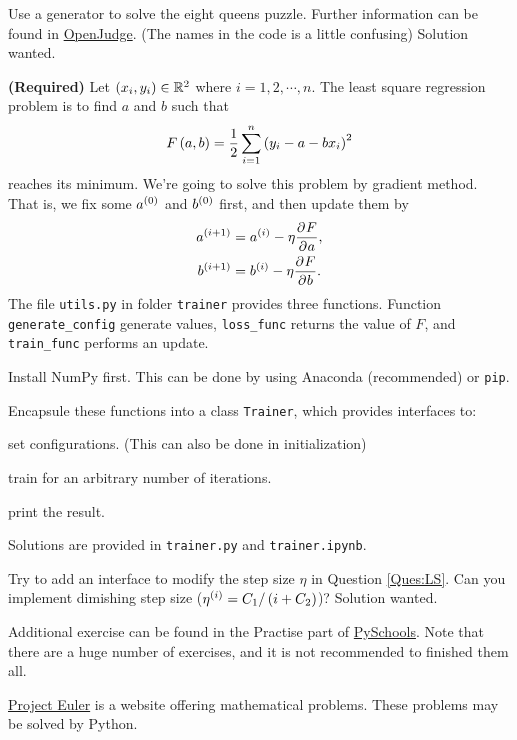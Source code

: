 \documentclass[english]{pkupaper}
\begin{document}
\begin{thmquestion}
Use a generator to solve the eight queens puzzle. Further information can be found in \href{http://cssyb.openjudge.cn/2017finalpython/B/}{OpenJudge}. (The names in the code is a little confusing) Solution wanted.
\end{thmquestion}

\begin{thmquestion} \label{Ques:LS}
\textbf{(Required)} Let $ \left(  x_i, y_i  \right) \in \mathbb{R}^2 $ where $ i = 1, 2, \cdots, n $. The least square regression problem is to find $a$ and $b$ such that
\begin{equation}
F \left(  a, b  \right) = \frac{1}{2} \sum_{ {i} = {1} }^{n}{\left(  y_i - a - b x_i  \right)^2}
\end{equation}
reaches its minimum. We're going to solve this problem by gradient method. That is, we fix some $a^{\left( 0 \right)}$ and $b^{\left( 0 \right)}$ first, and then update them by
\begin{gather}
a^{\left(  i + 1  \right)} = a^{\left( i \right)} - \eta \frac{ \mathop{\partial^{} \!} F }{ \mathop{\partial^{} \!} a }, \\
b^{\left(  i + 1  \right)} = b^{\left( i \right)} - \eta \frac{ \mathop{\partial^{} \!} F }{ \mathop{\partial^{} \!} b }.
\end{gather}
The file \verb"utils.py" in folder \verb"trainer" provides three functions. Function \verb"generate_config" generate values, \verb"loss_func" returns the value of $F$, and \verb"train_func" performs an update.
\begin{partlist}
\item Install NumPy first. This can be done by using Anaconda (recommended) or \verb"pip".
\item Encapsule these functions into a class \verb"Trainer", which provides interfaces to:
\begin{partpartlist}
\item set configurations. (This can also be done in initialization)
\item train for an arbitrary number of iterations.
\item print the result.
\end{partpartlist}
\end{partlist}
Solutions are provided in \verb"trainer.py" and \verb"trainer.ipynb".
\end{thmquestion}

\begin{thmquestion}
Try to add an interface to modify the step size $\eta$ in Question \ref{Ques:LS}. Can you implement dimishing step size ($ \eta^{\left( i \right)} = C_1 / \left(  i + C_2  \right) $)? Solution wanted.
\end{thmquestion}

Additional exercise can be found in the Practise part of \href{http://www.pyschools.com/}{PySchools}. Note that there are a huge number of exercises, and it is not recommended to finished them all.

\href{https://projecteuler.net/}{Project Euler} is a website offering mathematical problems. These problems may be solved by Python.

	
\end{document}
